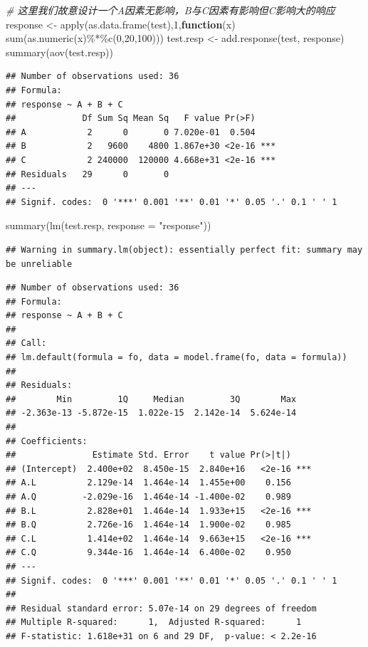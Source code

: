 \documentclass[]{tufte-book}
\newenvironment{Shaded}{}{}
\newcommand{\AttributeTok}[1]{\textcolor[rgb]{0.49,0.56,0.16}{#1}}
\newcommand{\CommentTok}[1]{\textcolor[rgb]{0.38,0.63,0.69}{\textit{#1}}}
\newcommand{\ControlFlowTok}[1]{\textcolor[rgb]{0.00,0.44,0.13}{\textbf{#1}}}
\newcommand{\DecValTok}[1]{\textcolor[rgb]{0.25,0.63,0.44}{#1}}
\newcommand{\FunctionTok}[1]{\textcolor[rgb]{0.02,0.16,0.49}{#1}}
\newcommand{\NormalTok}[1]{#1}
\newcommand{\OtherTok}[1]{\textcolor[rgb]{0.00,0.44,0.13}{#1}}
\newcommand{\SpecialCharTok}[1]{\textcolor[rgb]{0.25,0.44,0.63}{#1}}
\newcommand{\StringTok}[1]{\textcolor[rgb]{0.25,0.44,0.63}{#1}}
\begin{document}
\begin{Shaded}
\begin{Highlighting}[]
\CommentTok{\# 这里我们故意设计一个A因素无影响，B与C因素有影响但C影响大的响应}
\NormalTok{response }\OtherTok{\textless{}{-}} \FunctionTok{apply}\NormalTok{(}\FunctionTok{as.data.frame}\NormalTok{(test),}\DecValTok{1}\NormalTok{,}\ControlFlowTok{function}\NormalTok{(x) }\FunctionTok{sum}\NormalTok{(}\FunctionTok{as.numeric}\NormalTok{(x)}\SpecialCharTok{\%*\%}\FunctionTok{c}\NormalTok{(}\DecValTok{0}\NormalTok{,}\DecValTok{20}\NormalTok{,}\DecValTok{100}\NormalTok{)))}
\NormalTok{test.resp }\OtherTok{\textless{}{-}} \FunctionTok{add.response}\NormalTok{(test, response)}
\FunctionTok{summary}\NormalTok{(}\FunctionTok{aov}\NormalTok{(test.resp))}
\end{Highlighting}
\end{Shaded}

\begin{verbatim}
## Number of observations used: 36 
## Formula:
## response ~ A + B + C
##             Df Sum Sq Mean Sq   F value Pr(>F)    
## A            2      0       0 7.020e-01  0.504    
## B            2   9600    4800 1.867e+30 <2e-16 ***
## C            2 240000  120000 4.668e+31 <2e-16 ***
## Residuals   29      0       0                     
## ---
## Signif. codes:  0 '***' 0.001 '**' 0.01 '*' 0.05 '.' 0.1 ' ' 1
\end{verbatim}

\begin{Shaded}
\begin{Highlighting}[]
\FunctionTok{summary}\NormalTok{(}\FunctionTok{lm}\NormalTok{(test.resp, }\AttributeTok{response =} \StringTok{"response"}\NormalTok{))}
\end{Highlighting}
\end{Shaded}

\begin{verbatim}
## Warning in summary.lm(object): essentially perfect fit: summary may be unreliable
\end{verbatim}

\begin{verbatim}
## Number of observations used: 36 
## Formula:
## response ~ A + B + C
## 
## Call:
## lm.default(formula = fo, data = model.frame(fo, data = formula))
## 
## Residuals:
##        Min         1Q     Median         3Q        Max 
## -2.363e-13 -5.872e-15  1.022e-15  2.142e-14  5.624e-14 
## 
## Coefficients:
##               Estimate Std. Error    t value Pr(>|t|)    
## (Intercept)  2.400e+02  8.450e-15  2.840e+16   <2e-16 ***
## A.L          2.129e-14  1.464e-14  1.455e+00    0.156    
## A.Q         -2.029e-16  1.464e-14 -1.400e-02    0.989    
## B.L          2.828e+01  1.464e-14  1.933e+15   <2e-16 ***
## B.Q          2.726e-16  1.464e-14  1.900e-02    0.985    
## C.L          1.414e+02  1.464e-14  9.663e+15   <2e-16 ***
## C.Q          9.344e-16  1.464e-14  6.400e-02    0.950    
## ---
## Signif. codes:  0 '***' 0.001 '**' 0.01 '*' 0.05 '.' 0.1 ' ' 1
## 
## Residual standard error: 5.07e-14 on 29 degrees of freedom
## Multiple R-squared:      1,  Adjusted R-squared:      1 
## F-statistic: 1.618e+31 on 6 and 29 DF,  p-value: < 2.2e-16
\end{verbatim}
\end{document}
